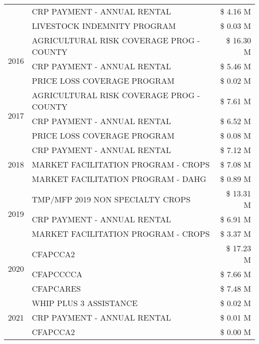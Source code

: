 \begin{tabular}{llr}
 & CRP PAYMENT - ANNUAL RENTAL & \$ 4.16 M \\
 & LIVESTOCK INDEMNITY PROGRAM & \$ 0.03 M \\
\cline{1-3}
\multirow[t]{3}{*}{2016} & AGRICULTURAL RISK COVERAGE PROG - COUNTY & \$ 16.30 M \\
 & CRP PAYMENT - ANNUAL RENTAL & \$ 5.46 M \\
 & PRICE LOSS COVERAGE PROGRAM & \$ 0.02 M \\
\cline{1-3}
\multirow[t]{3}{*}{2017} & AGRICULTURAL RISK COVERAGE PROG - COUNTY & \$ 7.61 M \\
 & CRP PAYMENT - ANNUAL RENTAL & \$ 6.52 M \\
 & PRICE LOSS COVERAGE PROGRAM & \$ 0.08 M \\
\cline{1-3}
\multirow[t]{3}{*}{2018} & CRP PAYMENT - ANNUAL RENTAL & \$ 7.12 M \\
 & MARKET FACILITATION PROGRAM - CROPS & \$ 7.08 M \\
 & MARKET FACILITATION PROGRAM - DAHG & \$ 0.89 M \\
\cline{1-3}
\multirow[t]{3}{*}{2019} & TMP/MFP 2019 NON SPECIALTY CROPS & \$ 13.31 M \\
 & CRP PAYMENT - ANNUAL RENTAL & \$ 6.91 M \\
 & MARKET FACILITATION PROGRAM - CROPS & \$ 3.37 M \\
\cline{1-3}
\multirow[t]{3}{*}{2020} & CFAPCCA2 & \$ 17.23 M \\
 & CFAPCCCCA & \$ 7.66 M \\
 & CFAPCARES & \$ 7.48 M \\
\cline{1-3}
\multirow[t]{3}{*}{2021} & WHIP PLUS 3 ASSISTANCE & \$ 0.02 M \\
 & CRP PAYMENT - ANNUAL RENTAL & \$ 0.01 M \\
 & CFAPCCA2 & \$ 0.00 M \\
\cline{1-3}
\bottomrule
\end{tabular}
